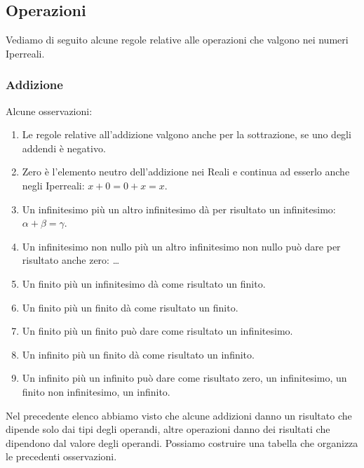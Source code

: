 \vspace{-5mm}

\subsection{Operazioni}
\label{subsec:insnum_operazioni}

Vediamo di seguito alcune regole relative alle operazioni 
che valgono nei numeri Iperreali.

\subsubsection{Addizione}
\label{subsec:insnum_addizione}

\begin{multicols}{2}
Alcune osservazioni:

\begin{enumerate} [noitemsep]
 \item Le regole relative all'addizione valgono anche per la sottrazione, 
se uno degli addendi è negativo. 
 \item Zero è l'elemento neutro dell'addizione nei Reali e continua ad 
esserlo anche negli Iperreali: \(x+0=0+x=x\).
 \item Un infinitesimo più un altro infinitesimo dà per risultato un 
infinitesimo: \(\alpha+\beta=\gamma\).
 \item Un infinitesimo non nullo più un altro infinitesimo non nullo può 
dare per risultato anche zero: \dots
 \item Un finito più un infinitesimo dà come risultato un finito.
 \item Un finito più un finito dà come risultato un finito.
 \item Un finito più un finito può dare come risultato un infinitesimo.
 \item Un infinito più un finito dà come risultato un infinito.
 \item Un infinito più un infinito può dare come risultato zero, un 
infinitesimo, un finito non infinitesimo, un infinito.
\end{enumerate}

Nel precedente elenco abbiamo visto che alcune addizioni danno un risultato 
che dipende solo dai tipi degli operandi, altre operazioni danno dei 
risultati 
che dipendono dal valore degli operandi. Possiamo costruire una tabella che 
organizza le precedenti osservazioni.


\end{multicols}
